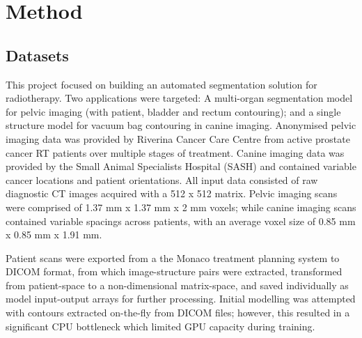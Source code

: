 \chapter{Method}
\label{ch:method}

\section{Datasets}
\label{ch:method-dataset}
This project focused on building an automated segmentation solution for radiotherapy. Two applications were targeted: A multi-organ segmentation model for pelvic imaging (with patient, bladder and rectum contouring); and a single structure model for vacuum bag contouring in canine imaging. Anonymised pelvic imaging data was provided by Riverina Cancer Care Centre from active prostate cancer RT patients over multiple stages of treatment. Canine imaging data was provided by the Small Animal Specialists Hospital (SASH) and contained variable cancer locations and patient orientations. All input data consisted of raw diagnostic CT images acquired with a 512 x 512 matrix. Pelvic imaging scans were comprised of 1.37 mm x 1.37 mm x 2 mm voxels; while canine imaging scans contained variable spacings across patients, with an average voxel size of 0.85 mm x 0.85 mm x 1.91 mm.

Patient scans were exported from a the Monaco treatment planning system
to DICOM format, from which image-structure pairs were extracted, transformed from patient-space to a non-dimensional matrix-space, and saved individually as model input-output arrays for further processing. Initial modelling was attempted with contours extracted on-the-fly from DICOM files; however, this resulted in a significant CPU bottleneck which limited GPU capacity during training.


